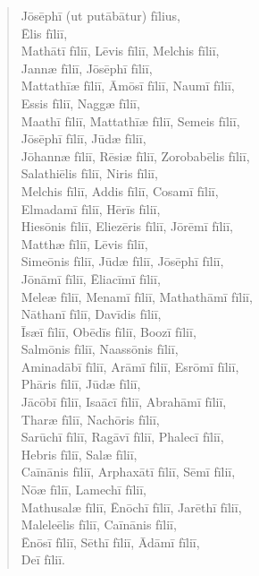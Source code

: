 \begin{verse}
\begin{patverse*}
Jōsēphī (ut putābātur) fīlius,\\
Ēlis fīliī,\\
\Versus Mathātī fīliī, Lēvis fīliī, Melchis fīliī,\\
Jannæ fīliī, Jōsēphī fīliī,\\
\Versus Mattathīæ fīliī, Āmōsī fīliī, Naumī fīliī,\\
Essis fīliī, Naggæ fīliī,\\
\Versus Maathī fīliī, Mattathīæ fīliī, Semeis fīliī,\\
Jōsēphī fīliī, Jūdæ fīliī,\\
\Versus Jōhannæ fīliī, Rēsiæ fīliī, Zorobabēlis fīliī,\\
Salathiēlis fīliī, Niris fīliī,\\
\Versus Melchis fīliī, Addis fīliī, Cosamī fīliī,\\
Elmadamī fīliī, Hērīs fīliī,\\
\Versus Hiesōnis fīliī, Eliezēris fīliī, Jōrēmī fīliī,\\
Matthæ fīliī, Lēvis fīliī,\\
\Versus Simeōnis fīliī, Jūdæ fīliī, Jōsēphī fīliī,\\
Jōnāmī fīliī, Ēliacīmī fīliī,\\
\Versus Meleæ fīliī, Menamī fīliī, Mathathāmī fīliī,\\
Nāthanī fīliī, Davīdis fīliī,\\
\Versus Īsæī fīliī, Obēdīs fīliī, Boozī fīliī,\\
Salmōnis fīliī, Naassōnis fīliī,\\
\Versus Aminadābī fīliī, Arāmī fīliī, Esrōmī fīliī,\\
Phāris fīliī, Jūdæ fīliī,\\
\Versus Jācōbī fīliī, Isaācī fīliī, Abrahāmī fīliī,\\
Tharæ fīliī, Nachōris fīliī,\\
\Versus Sarūchī fīliī, Ragāvī fīliī, Phalecī fīliī,\\
Hebris fīliī, Salæ fīliī,\\
\Versus Caīnānis fīliī, Arphaxātī fīliī, Sēmī fīliī,\\
Nōæ fīliī, Lamechī fīliī,\\
\Versus Mathusalæ fīliī, Ēnōchī fīliī, Jarēthī fīliī,\\
Maleleēlis fīliī, Caīnānis fīliī,\\
\Versus Ēnōsī fīliī, Sēthī fīliī, Ādāmī fīliī,\\
Deī fīliī.
\end{patverse*}
\end{verse}



